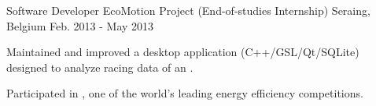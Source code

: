 \begin{cventries}
  \cventry
    {Software Developer} %
    {EcoMotion Project (End-of-studies Internship)} %
    {Seraing, Belgium} %
    {Feb. 2013 - May 2013} %
    {
      \begin{cvitems} %
        \item{Maintained and improved a desktop application (C++/GSL/Qt/SQLite) designed to analyze racing data of an .}
        \item{Participated in , one of the world's leading energy efficiency competitions.}
      \end{cvitems}
    }

\end{cventries}


